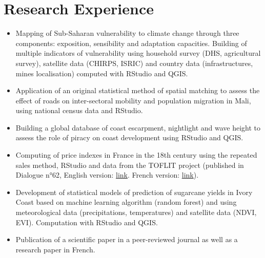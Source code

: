 \documentclass[11pt,a4paper,sans]{moderncv} %
\begin{document}
\section{Research Experience}
{
    \begin{itemize}
        \item[] Mapping of Sub-Saharan vulnerability to climate change through three components: exposition, sensibility and adaptation capacities. Building of multiple indicators of vulnerability using household survey (DHS, agricultural survey), satellite data (CHIRPS, ISRIC) and country data (infrastructures, mines localisation) computed with RStudio and QGIS.
        \item[] Application of an original statistical method of spatial matching to assess the effect of roads on inter-sectoral mobility and population migration in Mali, using national census data and RStudio.
        \item[] Building a global database of coast escarpment, nightlight and wave height to assess the role of piracy on coast development using RStudio and QGIS.
        \item[] Computing of price indexes in France in the 18th century using the repeated sales method, RStudio and data from the TOFLIT project (published in Dialogue n°62, English version: \href{https://dial.ird.fr/wp-content/uploads/2021/10/Dialogue_Eng_62_def.pdf}{link}. French version: \href{https://dial.ird.fr/wp-content/uploads/2021/10/Dialogue-62.pdf}{link}).
    \end{itemize} 
}

{\begin{itemize}
    \item[] Development of statistical models of prediction of sugarcane yields in Ivory Coast based on machine learning algorithm (random forest) and using meteorological data (precipitations, temperatures) and satellite data (NDVI, EVI). Computation with RStudio and QGIS.
    \item[] Publication of a scientific paper in a peer-reviewed journal as well as a research paper in French.
\end{itemize} }
\end{document}
